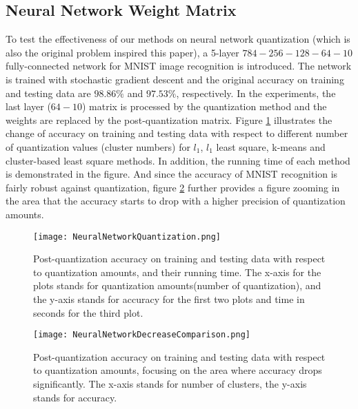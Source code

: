 \documentclass[preprint,10pt]{elsarticle}
\begin{document}
\subsection{Neural Network Weight Matrix}
To test the effectiveness of our methods on neural network quantization (which is also the original problem inspired this paper), a 5-layer  $784-256-128-64-10$ fully-connected network for MNIST image recognition is introduced. The network is trained with stochastic gradient descent and the original accuracy on training and testing data are $98.86\%$ and $97.53\%$, respectively. In the experiments, the last layer ($64-10$) matrix is processed by the quantization method and the weights are replaced by the post-quantization matrix. Figure \ref{fig:NNAccuracyHolistic} illustrates the change of accuracy on training and testing data with respect to different number of quantization values (cluster numbers) for $l_1$, $l_1$ least square, k-means and cluster-based least square methods. In addition, the running time of each method is demonstrated in the figure. And since the accuracy of MNIST recognition is fairly robust against quantization, figure \ref{fig:NNAccuracyZoomingIn} further provides a figure zooming in the area that the accuracy starts to drop with a higher precision of quantization amounts. 
\begin{figure}
\centering
\texttt{[image: NeuralNetworkQuantization.png]}
\caption{Post-quantization accuracy on training and testing data with respect to quantization amounts, and their running time. The x-axis for the plots stands for quantization amounts(number of quantization), and the y-axis stands for accuracy for the first two plots and time in seconds for the third plot.}
\label{fig:NNAccuracyHolistic}
\end{figure}
\begin{figure}
\centering
\texttt{[image: NeuralNetworkDecreaseComparison.png]}
\caption{Post-quantization accuracy on training and testing data with respect to quantization amounts, focusing on the area where accuracy drops significantly. The x-axis stands for number of clusters, the y-axis stands for accuracy.}
\label{fig:NNAccuracyZoomingIn}
\end{figure}
\par
\end{document}
